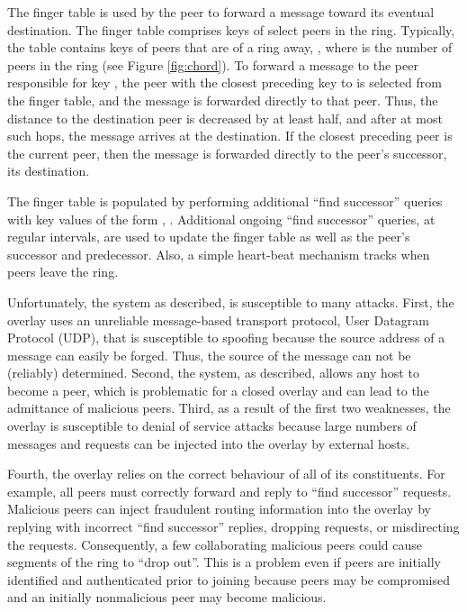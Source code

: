 \documentclass[11pt]{article}
\begin{document}
The finger table is used by the peer to forward a message toward
its eventual destination.  The finger table comprises keys of select
peers in the ring.  Typically, the table contains  keys
of peers that are  of a ring away, , where  is the number of peers in the ring (see Figure
\ref{fig:chord}).   To forward a message to the peer responsible
for key , the peer with the closest preceding key to  is
selected from the finger table, and the message is forwarded directly
to that peer.  Thus, the distance to the destination peer is decreased
by at least half, and after at most  such hops, the message
arrives at the destination.  If the closest preceding peer is the
current peer, then the message is forwarded directly to the peer's
successor, its destination.

The finger table is populated by performing additional ``find
successor'' queries with key values of the form , .  Additional ongoing ``find successor''
queries, at regular intervals, are used to update the finger table
as well as the peer's successor and predecessor.  Also, a simple
heart-beat mechanism tracks when peers leave the ring.

Unfortunately, the system as described, is susceptible to many
attacks.  First, the overlay uses an unreliable message-based
transport protocol, User Datagram Protocol (UDP), that is susceptible
to spoofing because the source address of a message can easily be
forged.  Thus, the source of the message can not be (reliably)
determined.  Second, the system, as described, allows any host to
become a peer, which is problematic for a closed overlay and can
lead to the admittance of malicious peers.  Third, as a result of
the first two weaknesses, the overlay is susceptible to denial of
service attacks because large numbers of messages and requests can
be injected into the overlay by external hosts.

Fourth, the overlay relies on the correct behaviour of all of its
constituents.  For example, all peers must correctly forward and
reply to ``find successor'' requests.  Malicious peers can inject
fraudulent routing information into the overlay by replying with
incorrect ``find successor'' replies, dropping requests, or
misdirecting the requests.  Consequently, a few collaborating
malicious peers could cause segments of the ring to ``drop out''.
This is a problem even if peers are initially identified and
authenticated prior to joining because peers may be compromised and
an initially nonmalicious peer may become malicious.
\end{document}
